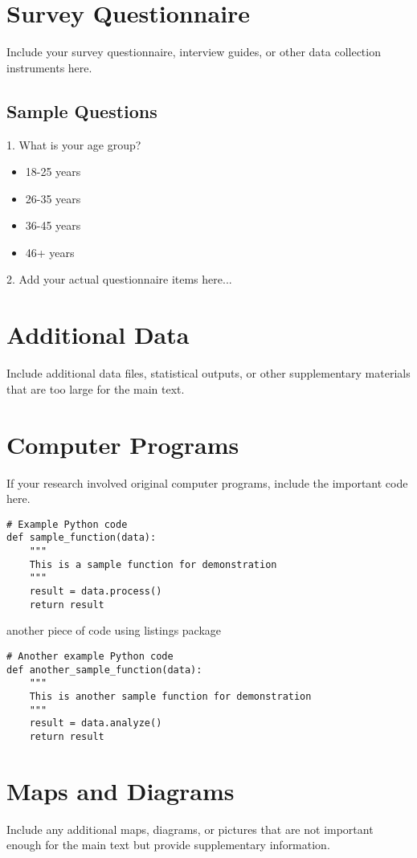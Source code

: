\appendix
\chapter{Survey Questionnaire}
\label{app:survey}

Include your survey questionnaire, interview guides, or other data collection instruments here.

\section{Sample Questions}

1. What is your age group?
   \begin{itemize}
       \item 18-25 years
       \item 26-35 years
       \item 36-45 years
       \item 46+ years
   \end{itemize}

2. Add your actual questionnaire items here...

\chapter{Additional Data}
\label{app:data}

Include additional data files, statistical outputs, or other supplementary materials that are too large for the main text.

\chapter{Computer Programs}
\label{app:programs}

If your research involved original computer programs, include the important code here.

\begin{verbatim}
# Example Python code
def sample_function(data):
    """
    This is a sample function for demonstration
    """
    result = data.process()
    return result
\end{verbatim}

another piece of code using listings package

\begin{lstlisting}
# Another example Python code
def another_sample_function(data):
    """
    This is another sample function for demonstration
    """
    result = data.analyze()
    return result
\end{lstlisting}

\chapter{Maps and Diagrams}
\label{app:maps}

Include any additional maps, diagrams, or pictures that are not important enough for the main text but provide supplementary information.
